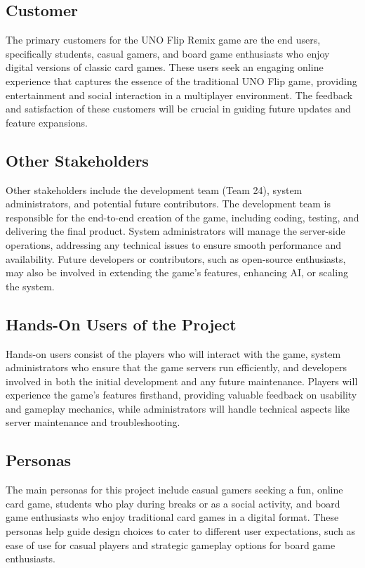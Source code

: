 \documentclass{article}
\begin{document}
\subsection{Customer}
The primary customers for the UNO Flip Remix game are the end users, specifically students, casual gamers, and board game enthusiasts who enjoy digital versions of classic card games. These users seek an engaging online experience that captures the essence of the traditional UNO Flip game, providing entertainment and social interaction in a multiplayer environment. The feedback and satisfaction of these customers will be crucial in guiding future updates and feature expansions.


\subsection{Other Stakeholders}
Other stakeholders include the development team (Team 24), system administrators, and potential future contributors. The development team is responsible for the end-to-end creation of the game, including coding, testing, and delivering the final product. System administrators will manage the server-side operations, addressing any technical issues to ensure smooth performance and availability. Future developers or contributors, such as open-source enthusiasts, may also be involved in extending the game’s features, enhancing AI, or scaling the system.

\subsection{Hands-On Users of the Project}
Hands-on users consist of the players who will interact with the game, system administrators who ensure that the game servers run efficiently, and developers involved in both the initial development and any future maintenance. Players will experience the game's features firsthand, providing valuable feedback on usability and gameplay mechanics, while administrators will handle technical aspects like server maintenance and troubleshooting.

\subsection{Personas}
The main personas for this project include casual gamers seeking a fun, online card game, students who play during breaks or as a social activity, and board game enthusiasts who enjoy traditional card games in a digital format. These personas help guide design choices to cater to different user expectations, such as ease of use for casual players and strategic gameplay options for board game enthusiasts.
\end{document}
